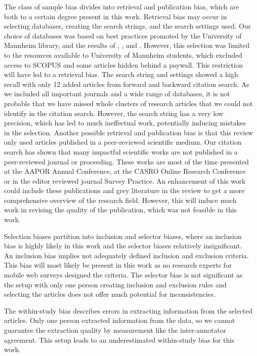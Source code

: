 The class of sample bias divides into retrieval and publication bias, which are both to a certain degree present in this work. Retrieval bias may occur in selecting databases, creating the search strings, and the search settings used. Our choice of databases was based on best practices promoted by the University of Mannheim library, and the results of \cite{pascoe_systematic_2021}, \cite{papaioannou_literature_2010}, and \cite{gusenbauer_which_2020}. However, this selection was limited to the resources available to University of Mannheim students, which excluded access to SCOPUS and some articles hidden behind a paywall. This restriction will have led to a retrieval bias. The search string and settings showed a high recall with only 12 added articles from forward and backward citation search. As we included all important journals and a wide range of databases, it is not probable that we have missed whole clusters of research articles that we could not identify in the citation search. However, the search string has a very low precision, which has led to much ineffectual work, potentially inducing mistakes in the selection. Another possible retrieval and publication bias is that this review only used articles published in a peer-reviewed scientific medium. Our citation search has shown that many impactful scientific works are not published in a peer-reviewed journal or proceeding. These works are most of the time presented at the AAPOR Annual Conference, at the CASRO Online Research Conference or in the editor reviewed journal Survey Practice. An enhancement of this work could include these publications and grey literature in the review to get a more comprehensive overview of the research field. However, this will induce much work in revising the quality of the publication, which was not feasible in this work.

Selection biases partition into inclusion and selector biases, where an inclusion bias is highly likely in this work and the selector biases relatively insignificant. An inclusion bias implies not adequately defined inclusion and exclusion criteria. This bias will most likely be present in this work as no research experts for mobile web surveys designed the criteria. The selector bias is not significant as the setup with only one person creating inclusion and exclusion rules and selecting the articles does not offer much potential for inconsistencies.

The within-study bias describes errors in extracting information from the selected articles. Only one person extracted information from the data, so we cannot guarantee the extraction quality by measurement like the inter-annotator agreement. This setup leads to an underestimated within-study bias for this work.

